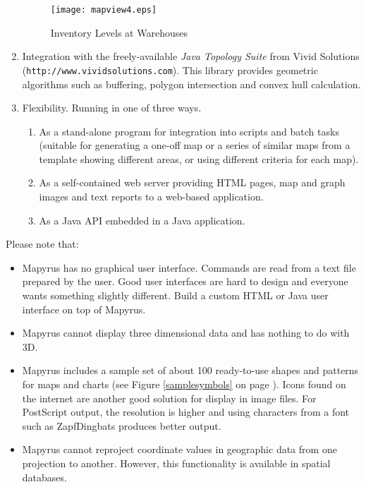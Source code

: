 \begin{enumerate}
\begin{figure}
\texttt{[image: mapview4.eps]}
\caption{Inventory Levels at Warehouses}
\label{mapview4}
\end{figure}


\item
Integration with the freely-available
\textit{Java Topology Suite} from Vivid Solutions
(\texttt{http://www.vividsolutions.com}).
This library provides geometric algorithms
such as buffering, polygon intersection and convex hull calculation.

\item
Flexibility.  Running in one of three ways.

\begin{enumerate}
\item
As a stand-alone program for integration into
scripts and batch tasks  (suitable for generating a one-off
map or a series of similar maps from a template
showing different areas, or using different criteria for each map).

\item
As a self-contained web server providing HTML pages, map and
graph images and text reports to a web-based application.

\item
As a Java API embedded in a Java application.
\end{enumerate}

\end{enumerate}


Please note that:

\begin{itemize}

\item
Mapyrus has no graphical user interface.
Commands are read from a text file prepared by the user.
Good user interfaces are
hard to design and everyone wants something slightly different.
Build a custom HTML or Java user interface on top of Mapyrus.

\item
Mapyrus cannot display three dimensional data and has nothing to do
with 3D.

\item
Mapyrus includes a sample set of about 100 ready-to-use shapes and patterns
for maps and charts (see Figure \ref{samplesymbols}
on page \pageref{samplesymbols}).
Icons found on the
internet are another good solution for display in image files.
For PostScript output, the resolution is higher and using characters
from a font such as ZapfDingbats produces better output.

\item
Mapyrus cannot reproject coordinate values in geographic data from
one projection to another.  However, this functionality
is available in spatial databases.
\end{itemize}

